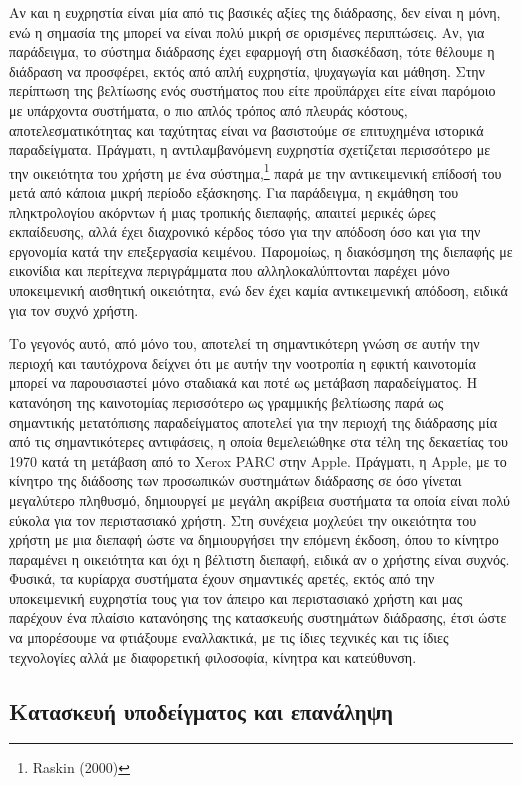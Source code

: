 \documentclass[
]{article}
\begin{document}
Αν και η ευχρηστία είναι μία από τις βασικές αξίες της διάδρασης, δεν
είναι η μόνη, ενώ η σημασία της μπορεί να είναι πολύ μικρή σε ορισμένες
περιπτώσεις. Αν, για παράδειγμα, το σύστημα διάδρασης έχει εφαρμογή στη
διασκέδαση, τότε θέλουμε η διάδραση να προσφέρει, εκτός από απλή
ευχρηστία, ψυχαγωγία και μάθηση. Στην περίπτωση της βελτίωσης ενός
συστήματος που είτε προϋπάρχει είτε είναι παρόμοιο με υπάρχοντα
συστήματα, ο πιο απλός τρόπος από πλευράς κόστους, αποτελεσματικότητας
και ταχύτητας είναι να βασιστούμε σε επιτυχημένα ιστορικά παραδείγματα.
Πράγματι, η αντιλαμβανόμενη ευχρηστία σχετίζεται περισσότερο με την
οικειότητα του χρήστη με ένα σύστημα,\footnote{Raskin (2000)} παρά με
την αντικειμενική επίδοσή του μετά από κάποια μικρή περίοδο εξάσκησης.
Για παράδειγμα, η εκμάθηση του πληκτρολογίου ακόρντων ή μιας τροπικής
διεπαφής, απαιτεί μερικές ώρες εκπαίδευσης, αλλά έχει διαχρονικό κέρδος
τόσο για την απόδοση όσο και για την εργονομία κατά την επεξεργασία
κειμένου. Παρομοίως, η διακόσμηση της διεπαφής με εικονίδια και
περίτεχνα περιγράμματα που αλληλοκαλύπτονται παρέχει μόνο υποκειμενική
αισθητική οικειότητα, ενώ δεν έχει καμία αντικειμενική απόδοση, ειδικά
για τον συχνό χρήστη.

Το γεγονός αυτό, από μόνο του, αποτελεί τη σημαντικότερη γνώση σε αυτήν
την περιοχή και ταυτόχρονα δείχνει ότι με αυτήν την νοοτροπία η εφικτή
καινοτομία μπορεί να παρουσιαστεί μόνο σταδιακά και ποτέ ως μετάβαση
παραδείγματος. Η κατανόηση της καινοτομίας περισσότερο ως γραμμικής
βελτίωσης παρά ως σημαντικής μετατόπισης παραδείγματος αποτελεί για την
περιοχή της διάδρασης μία από τις σημαντικότερες αντιφάσεις, η οποία
θεμελειώθηκε στα τέλη της δεκαετίας του 1970 κατά τη μετάβαση από το
Xerox PARC στην Apple. Πράγματι, η Apple, με το κίνητρο της διάδοσης των
προσωπικών συστημάτων διάδρασης σε όσο γίνεται μεγαλύτερο πληθυσμό,
δημιουργεί με μεγάλη ακρίβεια συστήματα τα οποία είναι πολύ εύκολα για
τον περιστασιακό χρήστη. Στη συνέχεια μοχλεύει την οικειότητα του χρήστη
με μια διεπαφή ώστε να δημιουργήσει την επόμενη έκδοση, όπου το κίνητρο
παραμένει η οικειότητα και όχι η βέλτιστη διεπαφή, ειδικά αν ο χρήστης
είναι συχνός. Φυσικά, τα κυρίαρχα συστήματα έχουν σημαντικές αρετές,
εκτός από την υποκειμενική ευχρηστία τους για τον άπειρο και
περιστασιακό χρήστη και μας παρέχουν ένα πλαίσιο κατανόησης της
κατασκευής συστημάτων διάδρασης, έτσι ώστε να μπορέσουμε να φτιάξουμε
εναλλακτικά, με τις ίδιες τεχνικές και τις ίδιες τεχνολογίες αλλά με
διαφορετική φιλοσοφία, κίνητρα και κατεύθυνση.

\hypertarget{ux3baux3b1ux3c4ux3b1ux3c3ux3baux3b5ux3c5ux3ae-ux3c5ux3c0ux3bfux3b4ux3b5ux3afux3b3ux3bcux3b1ux3c4ux3bfux3c2-ux3baux3b1ux3b9-ux3b5ux3c0ux3b1ux3bdux3acux3bbux3b7ux3c8ux3b7}{%
\subsection{Κατασκευή υποδείγματος και
επανάληψη}\label{ux3baux3b1ux3c4ux3b1ux3c3ux3baux3b5ux3c5ux3ae-ux3c5ux3c0ux3bfux3b4ux3b5ux3afux3b3ux3bcux3b1ux3c4ux3bfux3c2-ux3baux3b1ux3b9-ux3b5ux3c0ux3b1ux3bdux3acux3bbux3b7ux3c8ux3b7}}
\end{document}
